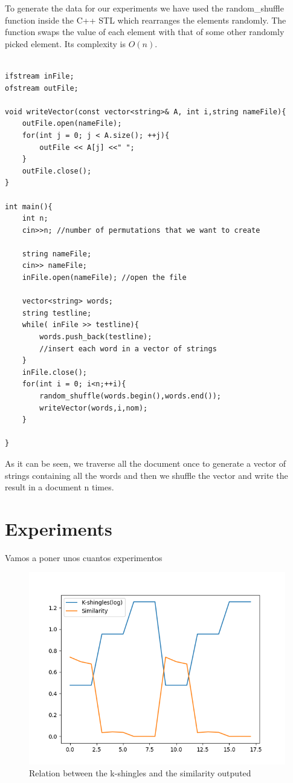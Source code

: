 \documentclass[12pt]{article}
\begin{document}
To generate the data for our experiments we have used the random\_shuffle function inside the C++ STL which rearranges the elements randomly. The function swaps the value of each element with that of some other randomly picked element. Its complexity is $O(n)$. %

\begin{lstlisting}

ifstream inFile;
ofstream outFile;

void writeVector(const vector<string>& A, int i,string nameFile){
    outFile.open(nameFile);
    for(int j = 0; j < A.size(); ++j){
        outFile << A[j] <<" ";
    }
    outFile.close();
}

int main(){
    int n; 
    cin>>n; //number of permutations that we want to create
         
    string nameFile;
    cin>> nameFile; 
    inFile.open(nameFile); //open the file
    
    vector<string> words; 
    string testline;
    while( inFile >> testline){
    	words.push_back(testline); 
    	//insert each word in a vector of strings
    }
    inFile.close();
    for(int i = 0; i<n;++i){
    	random_shuffle(words.begin(),words.end()); 
    	writeVector(words,i,nom);
    }
    
}\end{lstlisting}


As it can be seen, we traverse all the document once to generate a vector of strings containing all the words and then we shuffle the vector and write the result in a document n times. \\

\section{Experiments}
Vamos a poner unos cuantos experimentos

\begin{figure}[h]
	\includegraphics[scale=1]{JaccardSimilarity_KShinglesSimilarity.png} 
  \caption{Relation between the k-shingles and the similarity outputed}
  \label{fig:KShinglesSimilarity}
\end{figure}
\end{document}
